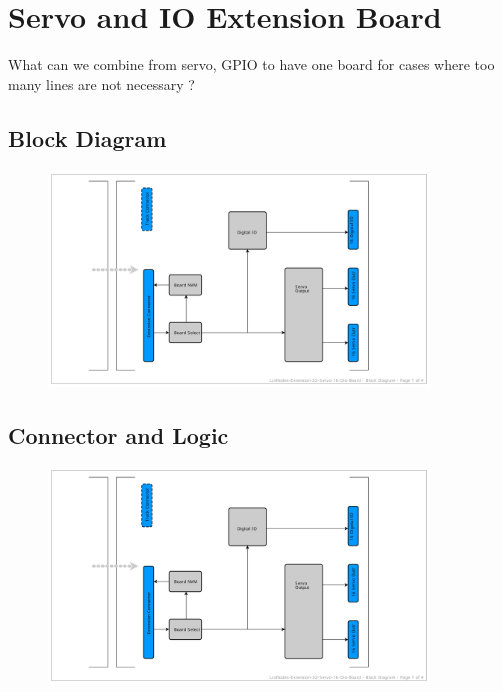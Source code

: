 \chapter{Servo and IO Extension Board}

What can we combine from servo, GPIO to have one board for cases where too many lines are not necessary ?

\section{Block Diagram}

\begin{figure}[htbp]
    \centering
    \includegraphics[page=1, width=0.9\textwidth]{./Schematics/Schematic_LcsNodes-Extension-32-Servo-16-Dio-Board.pdf}
\end{figure}
\FloatBarrier

\section{Connector and Logic}

\begin{figure}[htbp]
    \centering
    \includegraphics[page=2, width=0.9\textwidth]{./Schematics/Schematic_LcsNodes-Extension-32-Servo-16-Dio-Board.pdf}
\end{figure}
\FloatBarrier

